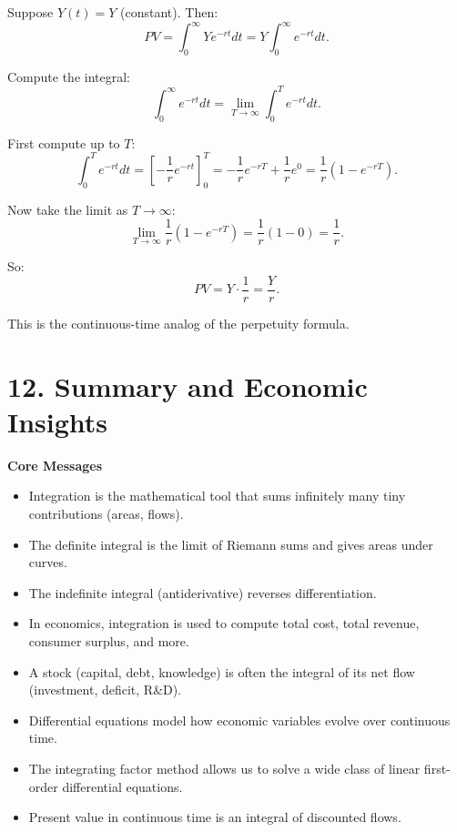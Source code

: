 \documentclass[12pt]{article}
\begin{document}
Suppose $Y(t)=Y$ (constant). Then:
\[
PV = \int_0^\infty Y e^{-rt}dt = Y\int_0^\infty e^{-rt}dt.
\]

Compute the integral:
\[
\int_0^\infty e^{-rt}dt = \lim_{T\to\infty} \int_0^T e^{-rt}dt.
\]

First compute up to $T$:
\[
\int_0^T e^{-rt}dt = \left[-\frac{1}{r}e^{-rt}\right]_0^T = -\frac{1}{r}e^{-rT} + \frac{1}{r}e^{0} = \frac{1}{r}(1 - e^{-rT}).
\]

Now take the limit as $T\to\infty$:
\[
\lim_{T\to\infty} \frac{1}{r}(1 - e^{-rT}) = \frac{1}{r}(1-0) = \frac{1}{r}.
\]

So:
\[
PV=Y\cdot \frac{1}{r} = \frac{Y}{r}.
\]

This is the continuous-time analog of the perpetuity formula.

\section*{12. Summary and Economic Insights}

\begin{tcolorbox}
\textbf{Core Messages}
\begin{itemize}
\item Integration is the mathematical tool that sums infinitely many tiny contributions (areas, flows).
\item The definite integral is the limit of Riemann sums and gives areas under curves.
\item The indefinite integral (antiderivative) reverses differentiation.
\item In economics, integration is used to compute total cost, total revenue, consumer surplus, and more.
\item A stock (capital, debt, knowledge) is often the integral of its net flow (investment, deficit, R\&D).
\item Differential equations model how economic variables evolve over continuous time.
\item The integrating factor method allows us to solve a wide class of linear first-order differential equations.
\item Present value in continuous time is an integral of discounted flows.
\end{itemize}
\end{tcolorbox}
\end{document}
